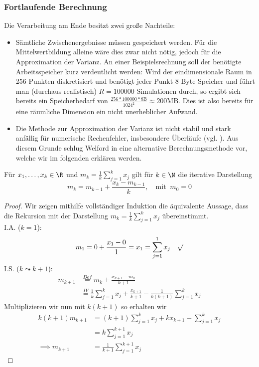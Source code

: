 \subsubsection*{Fortlaufende Berechnung}
Die Verarbeitung am Ende besitzt zwei große Nachteile:
\begin{itemize}
\item Sämtliche Zwischenergebnisse müssen gespeichert werden. Für die Mittelwertbildung alleine wäre dies zwar nicht nötig, jedoch für die Approximation der Varianz. An einer Beispielsrechnung soll der benötigte Arbeitsspeicher kurz verdeutlicht werden: Wird der eindimensionale Raum in 256 Punkten diskretisiert und benötigt jeder Punkt 8 Byte Speicher und führt man (durchaus realistisch) $R=100000$ Simulationen durch, so ergibt sich bereits ein Speicherbedarf von $\frac{256*100000*8\text{B}}{1024^2}\approx 200\text{MB}$. Dies ist also bereits für eine räumliche Dimension ein nicht unerheblicher Aufwand.
\item Die Methode zur Approximation der Varianz ist nicht stabil und stark anfällig für numerische Rechenfehler, insbesondere Überläufe (vgl. \autocite{cook08}). Aus diesem Grunde schlug Welford in \autocite{welford62} eine alternative Berechnungsmethode vor, welche wir im folgenden erklären werden.
\end{itemize}
\begin{maththeorem}
\label{thiterativemk}
Für $x_1,\dots,x_k\in\R$ und $m_k=\frac{1}{k}\sum_{j=1}^kx_j$ gilt für $k\in\N$ die iterative Darstellung
\[m_k=m_{k-1}+\frac{x_k-m_{k-1}}{k},\quad \text{mit }\: m_0=0\]
\end{maththeorem}
\begin{proof}
Wir zeigen mithilfe vollständiger Induktion die äquivalente Aussage, dass die Rekursion mit der Darstellung $m_k=\frac{1}{k}\sum_{j=1}^kx_j$ übereinstimmt.\\
I.A. ($k=1$): \[m_1=0+\frac{x_1-0}{1}=x_1=\sum_{j=1}^1x_j\quad\surd\]
I.S. ($k\leadsto k+1$):
\begin{align*}
m_{k+1}&\stackrel{Def}{=}m_k+\frac{x_{k+1}-m_k}{k+1}\\
&\stackrel{IV}{=}\frac{1}{k}\sum_{j=1}^kx_j+\frac{x_{k+1}}{k+1}-\frac{1}{k(k+1)}\sum_{j=1}^kx_j
\end{align*}
Multiplizieren wir nun mit $k(k+1)$ so erhalten wir
\begin{align*}
k(k+1)m_{k+1}&=(k+1)\sum_{j=1}^kx_j+kx_{k+1}-\sum_{j=1}^kx_j\\
&=k\sum_{j=1}^{k+1}x_j\\
\implies m_{k+1}&=\frac{1}{k+1}\sum_{j=1}^{k+1}x_j
\end{align*}
\end{proof}
